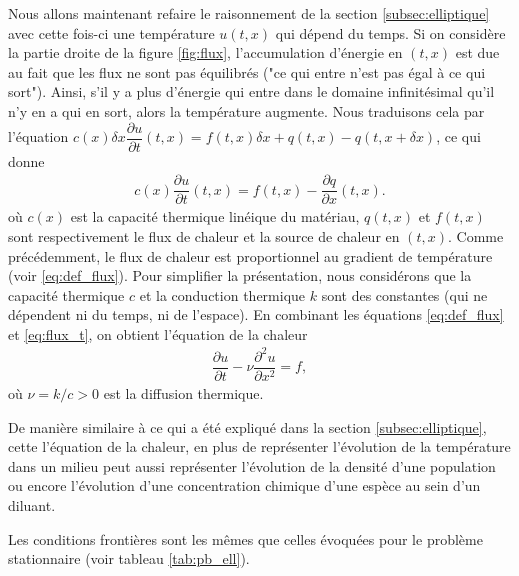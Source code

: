\documentclass[12pt,a4paper,twoside]{article}
\begin{document}
Nous allons maintenant refaire le raisonnement de la section \ref{subsec:elliptique}
avec cette fois-ci une temp\'erature $u(t,x)$ qui d\'epend du temps.
Si on consid\`ere la partie droite de la figure \ref{fig:flux}, l'accumulation
d'\'energie en $(t,x)$ est due au fait que les flux ne sont pas \'equilibr\'es
("ce qui entre n'est pas \'egal \`a ce qui sort").
Ainsi, s'il y a plus d'\'energie qui entre dans le domaine infinit\'esimal
qu'il n'y en a qui en sort,
alors la temp\'erature augmente.
Nous traduisons cela par l'\'equation
$c (x) \delta x \dfrac{\partial u}{\partial t}(t,x) = f(t,x) \delta x 
  + q(t,x) - q(t,x + \delta x)$, ce qui donne
\begin{align}
  \label{eq:flux_t}
  c (x) \dfrac{\partial u}{\partial t}(t,x) = f(t,x) - \dfrac{\partial q}{\partial x} (t,x) .
\end{align}
o\`u $c(x)$ est la capacit\'e thermique lin\'eique du mat\'eriau,
$q(t,x)$ et $f(t,x)$ sont respectivement le flux de chaleur 
et la source de chaleur en $(t,x)$.
Comme pr\'ec\'edemment, le flux de chaleur est proportionnel au gradient 
de temp\'erature (voir \eqref{eq:def_flux}).
Pour simplifier la pr\'esentation, nous consid\'erons que la capacit\'e
thermique $c$ et la conduction thermique $k$ sont des constantes 
(qui ne d\'ependent ni du temps, ni de l'espace).
En combinant les \'equations \eqref{eq:def_flux} et \eqref{eq:flux_t},
on obtient l'\'equation de la chaleur
\begin{align}
  \label{eq:chaleur}
  \dfrac{\partial u}{\partial t} - \nu \dfrac{\partial^2 u}{\partial x^2} = f ,
\end{align}
o\`u $\nu = k/c > 0$ est la diffusion thermique.


De mani\`ere similaire \`a ce qui a \'et\'e expliqu\'e dans la section \ref{subsec:elliptique},
cette l'\'equation de la chaleur, en plus de repr\'esenter l'\'evolution de la temp\'erature
dans un milieu peut aussi repr\'esenter l'\'evolution de la densit\'e d'une population
ou encore l'\'evolution d'une concentration chimique d'une esp\`ece au sein d'un diluant.

Les conditions fronti\`eres sont les m\^emes que celles \'evoqu\'ees pour le probl\`eme
stationnaire (voir tableau \ref{tab:pb_ell}).
\end{document}
